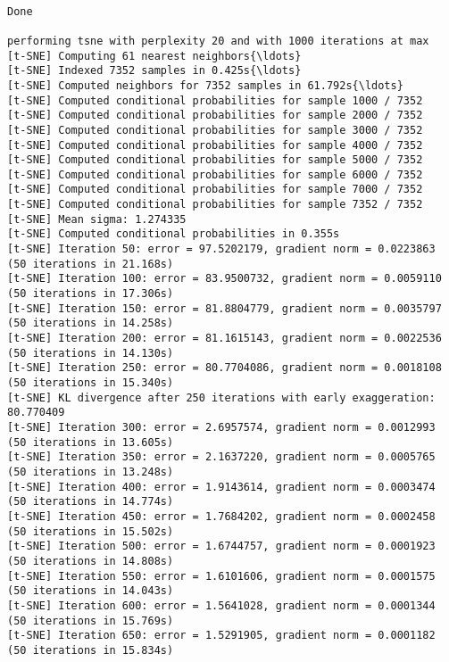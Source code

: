 \documentclass[11pt]{article}
\begin{document}
    \begin{center}
    \end{center}
    { \hspace*{\fill} \\}
    
    \begin{Verbatim}[commandchars=\\\{\}]
Done

performing tsne with perplexity 20 and with 1000 iterations at max
[t-SNE] Computing 61 nearest neighbors{\ldots}
[t-SNE] Indexed 7352 samples in 0.425s{\ldots}
[t-SNE] Computed neighbors for 7352 samples in 61.792s{\ldots}
[t-SNE] Computed conditional probabilities for sample 1000 / 7352
[t-SNE] Computed conditional probabilities for sample 2000 / 7352
[t-SNE] Computed conditional probabilities for sample 3000 / 7352
[t-SNE] Computed conditional probabilities for sample 4000 / 7352
[t-SNE] Computed conditional probabilities for sample 5000 / 7352
[t-SNE] Computed conditional probabilities for sample 6000 / 7352
[t-SNE] Computed conditional probabilities for sample 7000 / 7352
[t-SNE] Computed conditional probabilities for sample 7352 / 7352
[t-SNE] Mean sigma: 1.274335
[t-SNE] Computed conditional probabilities in 0.355s
[t-SNE] Iteration 50: error = 97.5202179, gradient norm = 0.0223863 (50 iterations in 21.168s)
[t-SNE] Iteration 100: error = 83.9500732, gradient norm = 0.0059110 (50 iterations in 17.306s)
[t-SNE] Iteration 150: error = 81.8804779, gradient norm = 0.0035797 (50 iterations in 14.258s)
[t-SNE] Iteration 200: error = 81.1615143, gradient norm = 0.0022536 (50 iterations in 14.130s)
[t-SNE] Iteration 250: error = 80.7704086, gradient norm = 0.0018108 (50 iterations in 15.340s)
[t-SNE] KL divergence after 250 iterations with early exaggeration: 80.770409
[t-SNE] Iteration 300: error = 2.6957574, gradient norm = 0.0012993 (50 iterations in 13.605s)
[t-SNE] Iteration 350: error = 2.1637220, gradient norm = 0.0005765 (50 iterations in 13.248s)
[t-SNE] Iteration 400: error = 1.9143614, gradient norm = 0.0003474 (50 iterations in 14.774s)
[t-SNE] Iteration 450: error = 1.7684202, gradient norm = 0.0002458 (50 iterations in 15.502s)
[t-SNE] Iteration 500: error = 1.6744757, gradient norm = 0.0001923 (50 iterations in 14.808s)
[t-SNE] Iteration 550: error = 1.6101606, gradient norm = 0.0001575 (50 iterations in 14.043s)
[t-SNE] Iteration 600: error = 1.5641028, gradient norm = 0.0001344 (50 iterations in 15.769s)
[t-SNE] Iteration 650: error = 1.5291905, gradient norm = 0.0001182 (50 iterations in 15.834s)

\end{Verbatim}
\end{document}

